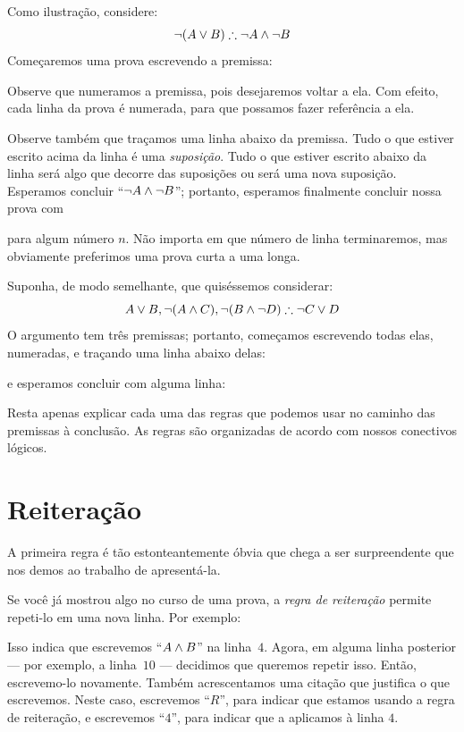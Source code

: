 Como ilustração, considere:
	$$\enot (A \eor B) \therefore \enot A \eand \enot B$$
Começaremos uma prova escrevendo a premissa:
\begin{fitchproof}
	\PR
\end{fitchproof}
Observe que numeramos a premissa, pois desejaremos voltar a ela. Com efeito, cada linha da prova é numerada, para que possamos fazer referência a ela.

Observe também que traçamos uma linha abaixo da premissa. Tudo o que estiver escrito acima da linha é uma \emph{suposição}. Tudo o que estiver escrito abaixo da linha será algo que decorre das suposições ou será uma nova suposição. Esperamos concluir \textquotedblleft$\neg A \wedge \neg B$\textquotedblright{}; portanto, esperamos finalmente concluir nossa prova com
\begin{fitchproof}
\end{fitchproof}
para algum número $n$. Não importa em que número de linha terminaremos, mas obviamente preferimos uma prova curta a uma longa.

Suponha, de modo semelhante, que quiséssemos considerar:
$$A\eor B, \enot (A\eand C), \enot (B \eand \enot D) \therefore \enot C\eor D$$
O argumento tem três premissas; portanto, começamos escrevendo todas elas, numeradas, e traçando uma linha abaixo delas:
\begin{fitchproof}
	\PR
	\PR
	\PR
\end{fitchproof}
e esperamos concluir com alguma linha:
\begin{fitchproof}
\end{fitchproof}
Resta apenas explicar cada uma das regras que podemos usar no caminho das premissas à conclusão. As regras são organizadas de acordo com nossos conectivos lógicos.

\section{Reiteração}
A primeira regra é tão estonteantemente óbvia que chega a ser surpreendente que nos demos ao trabalho de apresentá-la.

Se você já mostrou algo no curso de uma prova, a \emph{regra de reiteração} permite repeti-lo em uma nova linha. Por exemplo:
\begin{fitchproof}
	\ellipsesline
	 
\end{fitchproof}
Isso indica que escrevemos \textquotedblleft$A \wedge B$\textquotedblright{} na linha~$4$. Agora, em alguma linha posterior — por exemplo, a linha~$10$ — decidimos que queremos repetir isso. Então, escrevemo-lo novamente. Também acrescentamos uma citação que justifica o que escrevemos. Neste caso, escrevemos \textquotedblleft$R$\textquotedblright{}, para indicar que estamos usando a regra de reiteração, e escrevemos \textquotedblleft$4$\textquotedblright{}, para indicar que a aplicamos à linha $4$.

